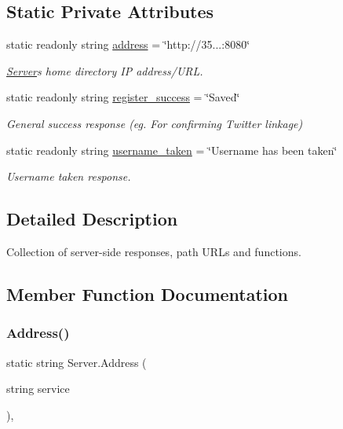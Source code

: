 \subsection*{Static Private Attributes}
\begin{DoxyCompactItemize}
\item 
static readonly string \mbox{\hyperlink{class_server_a4db3f96fe18261d12fd6eef5476aa69d}{address}} = \char`\"{}http\+://35...\+:8080\char`\"{}
\begin{DoxyCompactList}\small\item\em \mbox{\hyperlink{class_server}{Server}}\textquotesingle{}s home directory IP address/\+U\+RL. \end{DoxyCompactList}\item 
static readonly string \mbox{\hyperlink{class_server_a2e16618d6f2b9f4308203f4053d54545}{register\+\_\+success}} = \char`\"{}Saved\char`\"{}
\begin{DoxyCompactList}\small\item\em General success response (eg. For confirming Twitter linkage) \end{DoxyCompactList}\item 
static readonly string \mbox{\hyperlink{class_server_a0d876aba3addd4f76cf9d998f0552048}{username\+\_\+taken}} = \char`\"{}Username has been taken\char`\"{}
\begin{DoxyCompactList}\small\item\em Username taken response. \end{DoxyCompactList}\end{DoxyCompactItemize}


\subsection{Detailed Description}
Collection of server-\/side responses, path U\+R\+Ls and functions. 

\subsection{Member Function Documentation}
\mbox{\label{class_server_a0a701ca3c73b238ca8808eb05897988c}} 
\subsubsection{\texorpdfstring{Address()}{Address()}}
{\footnotesize\ttfamily static string Server.\+Address (\begin{DoxyParamCaption}\item[{string}]{service }\end{DoxyParamCaption})\hspace{0.3cm}{\ttfamily [inline]}, {\ttfamily [static]}}




